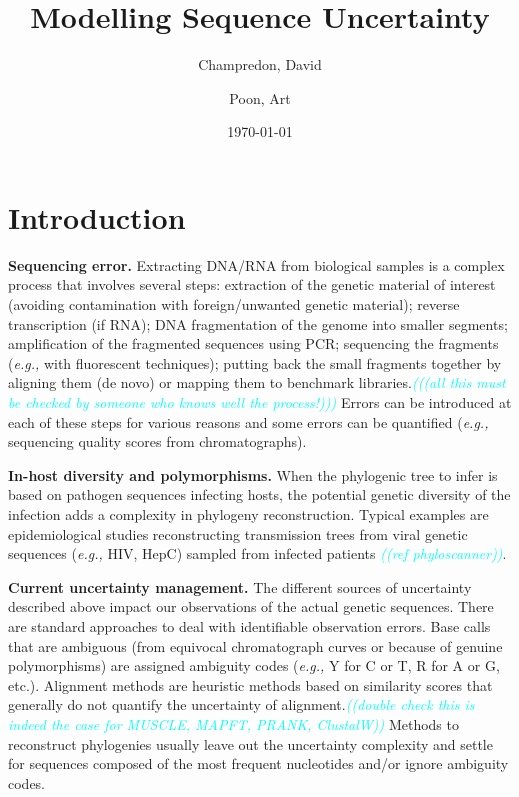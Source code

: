 \documentclass[10pt]{article}
\title{Modelling Sequence Uncertainty}
\author{Champredon, David \and Poon, Art}
\date{\today}
\newcommand{\comment}[1]{\textsl{\textcolor{cyan}{((#1))}}}
\newcommand{\eg}{\textit{e.g.,}\xspace}
\begin{document}
\maketitle
\linenumbers

\tableofcontents

\newpage

\section{Introduction}


\textbf{Sequencing error.} 
Extracting DNA/RNA from biological samples is a complex process that involves several steps: extraction of the genetic material of interest (avoiding contamination with foreign/unwanted genetic material); reverse transcription (if RNA); DNA fragmentation of the genome into smaller segments; amplification of the fragmented sequences using PCR; sequencing the fragments (\eg with fluorescent techniques); putting back the small fragments together by aligning them (de novo) or mapping them to benchmark libraries.\comment{(all this must be checked by someone who knows well the process!)}
Errors can be introduced at each of these steps for various reasons \cite{Beerenwinkel:2011} and some errors can be quantified (\eg sequencing quality scores from chromatographs). 

\textbf{In-host diversity and polymorphisms.} 
When the phylogenic tree to infer is based on pathogen sequences infecting hosts, the potential genetic diversity of the infection adds a complexity in phylogeny reconstruction. Typical examples are epidemiological studies reconstructing transmission trees from viral genetic sequences (\eg HIV, HepC) sampled from infected patients \comment{ref phyloscanner}. 


\textbf{Current uncertainty management.} 
The different sources of uncertainty described above impact our observations of the actual genetic sequences.
There are standard approaches to deal with identifiable observation errors. 
Base calls that are ambiguous (from equivocal chromatograph curves or because of genuine polymorphisms) are assigned ambiguity codes (\eg Y for C or T, R for A or G, etc.).
Alignment methods are heuristic methods based on similarity scores that generally do not quantify the uncertainty of alignment.\comment{double check this is indeed the case for MUSCLE, MAPFT, PRANK, ClustalW}
Methods to reconstruct phylogenies usually leave out the uncertainty complexity and settle for sequences composed of the most frequent nucleotides and/or ignore ambiguity codes.
\end{document}
